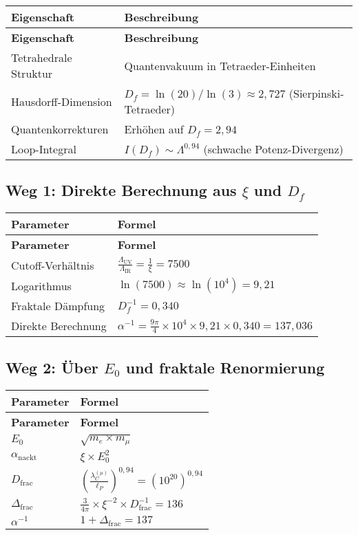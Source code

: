 \documentclass[12pt,a4paper]{article}
\begin{document}
	\begin{longtable}{|p{4cm}|p{6cm}|}
		\hline
		\textbf{Eigenschaft} & \textbf{Beschreibung} \\
		\hline
		\endfirsthead
		\hline
		\textbf{Eigenschaft} & \textbf{Beschreibung} \\
		\hline
		\endhead
		Tetrahedrale Struktur & Quantenvakuum in Tetraeder-Einheiten \\
		\hline
		Hausdorff-Dimension & \(D_f = \ln(20)/\ln(3) \approx 2{,}727\) (Sierpinski-Tetraeder) \\
		\hline
		Quantenkorrekturen & Erhöhen auf \(D_f = 2{,}94\) \\
		\hline
		Loop-Integral & \(I(D_f) \sim \Lambda^{0{,}94}\) (schwache Potenz-Divergenz) \\
		\hline
	\end{longtable}
	
	\subsection{Weg 1: Direkte Berechnung aus \(\xi\) und \(D_f\)}
	
	\begin{longtable}{|p{4cm}|p{6cm}|}
		\hline
		\textbf{Parameter} & \textbf{Formel} \\
		\hline
		\endfirsthead
		\hline
		\textbf{Parameter} & \textbf{Formel} \\
		\hline
		\endhead
		Cutoff-Verhältnis & \(\frac{\Lambda_{\text{UV}}}{\Lambda_{\text{IR}}} = \frac{1}{\xi} = 7500\) \\
		\hline
		Logarithmus & \(\ln(7500) \approx \ln(10^4) = 9{,}21\) \\
		\hline
		Fraktale Dämpfung & \(D_f^{-1} = 0{,}340\) \\
		\hline
		Direkte Berechnung & \(\alpha^{-1} = \frac{9\pi}{4} \times 10^4 \times 9{,}21 \times 0{,}340 = 137{,}036\) \\
		\hline
	\end{longtable}
	
	\subsection{Weg 2: Über \(E_0\) und fraktale Renormierung}
	
	\begin{longtable}{|p{3cm}|p{5cm}|}
		\hline
		\textbf{Parameter} & \textbf{Formel} \\
		\hline
		\endfirsthead
		\hline
		\textbf{Parameter} & \textbf{Formel} \\
		\hline
		\endhead
		\(E_0\) & \(\sqrt{m_e \times m_{\mu}}\) \\
		\hline
		\(\alpha_{\text{nackt}}\) & \(\xi \times E_0^2\) \\
		\hline
		\(D_{\text{frac}}\) & \(\left(\frac{\lambda_C^{(\mu)}}{\ell_P}\right)^{0{,}94} = (10^{20})^{0{,}94}\) \\
		\hline
		\(\Delta_{\text{frac}}\) & \(\frac{3}{4\pi} \times \xi^{-2} \times D_{\text{frac}}^{-1} = 136\) \\
		\hline
		\(\alpha^{-1}\) & \(1 + \Delta_{\text{frac}} = 137\) \\
		\hline
	\end{longtable}
	
\end{document}
